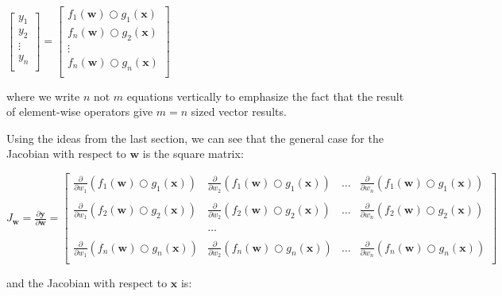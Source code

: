 \documentclass[11pt]{article}
\begin{document}
$\begin{bmatrix}
           y_1\\
           y_2\\
           \vdots \\
           y_n\\
           \end{bmatrix} = \begin{bmatrix}
           f_{1}(\mathbf{w}) \bigcirc g_{1}(\mathbf{x})\\
           f_{n}(\mathbf{w}) \bigcirc g_{2}(\mathbf{x})\\
           \vdots \\
           f_{n}(\mathbf{w}) \bigcirc g_{n}(\mathbf{x})\\
         \end{bmatrix}$

where we write $n$ not $m$ equations vertically to emphasize the fact that the result of element-wise operators give $m=n$ sized vector results.

Using the ideas from the last section, we can see that the general case for the Jacobian with respect to $\mathbf{w}$ is the square matrix:

$J_\mathbf{w} = 
\frac{\partial \mathbf{y}}{\partial \mathbf{w}}  = \begin{bmatrix}
\frac{\partial}{\partial w_1} ( f_{1}(\mathbf{w}) \bigcirc g_{1}(\mathbf{x}) ) & \frac{\partial}{\partial w_2} ( f_{1}(\mathbf{w}) \bigcirc g_{1}(\mathbf{x}) ) & \ldots & \frac{\partial}{\partial w_n} ( f_{1}(\mathbf{w}) \bigcirc g_{1}(\mathbf{x}) )\\\\
\frac{\partial}{\partial w_1} ( f_{2}(\mathbf{w}) \bigcirc g_{2}(\mathbf{x}) ) & \frac{\partial}{\partial w_2} ( f_{2}(\mathbf{w}) \bigcirc g_{2}(\mathbf{x}) ) & \ldots & \frac{\partial}{\partial w_n} ( f_{2}(\mathbf{w}) \bigcirc g_{2}(\mathbf{x}) )\\\\
& \ldots\\\\
\frac{\partial}{\partial w_1} ( f_{n}(\mathbf{w}) \bigcirc g_{n}(\mathbf{x}) ) & \frac{\partial}{\partial w_2} ( f_{n}(\mathbf{w}) \bigcirc g_{n}(\mathbf{x}) ) & \ldots & \frac{\partial}{\partial w_n} ( f_{n}(\mathbf{w}) \bigcirc g_{n}(\mathbf{x}) )\\
\end{bmatrix}
$

and the Jacobian with respect to $\mathbf{x}$ is:
\end{document}
